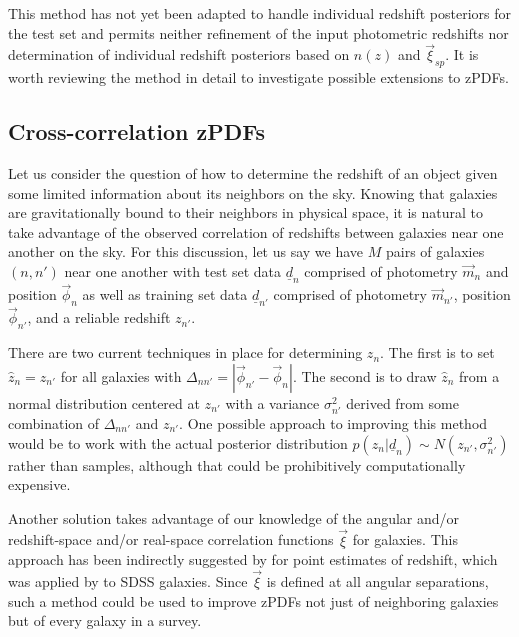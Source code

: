 \documentclass[12pt, onecolumn]{emulateapj}
\newcommand{\textul}{\underline}
\begin{document}
\begin{enumerate}
\end{enumerate}

This method has not yet been adapted to handle individual redshift posteriors for the test set and permits neither refinement of the input photometric redshifts nor determination of individual redshift posteriors based on $n(z)$ and $\vec{\xi}_{sp}$.  It is worth reviewing the method in detail to investigate possible extensions to zPDFs.

\subsection{Cross-correlation zPDFs}

Let us consider the question of how to determine the redshift of an object given some limited information about its neighbors on the sky.  Knowing that galaxies are gravitationally bound to their neighbors in physical space, it is natural to take advantage of the observed correlation of redshifts between galaxies near one another on the sky.  For this discussion, let us say we have $M$ pairs of galaxies $(n,n')$ near one another with test set data $\textul{d}_{n}$ comprised of photometry $\vec{m}_{n}$ and position $\vec{\phi}_{n}$ as well as training set data $\textul{d}_{n'}$ comprised of photometry $\vec{m}_{n'}$, position $\vec{\phi}_{n'}$, and a reliable redshift $z_{n'}$.  

There are two current techniques in place for determining $z_{n}$.  The first is to set $\hat{z}_{n}=z_{n'}$ for all galaxies with $\Delta_{nn'}=|\vec{\phi}_{n'}-\vec{\phi}_{n}|$.  The second is to draw $\hat{z}_{n}$ from a normal distribution centered at $z_{n'}$ with a variance $\sigma^{2}_{n'}$ derived from some combination of $\Delta_{nn'}$ and $z_{n'}$.  One possible approach to improving this method would be to work with the actual posterior distribution $p(z_{n}|\textul{d}_{n})\sim N(z_{n'},\sigma^{2}_{n'})$ rather than samples, although that could be prohibitively computationally expensive.

Another solution takes advantage of our knowledge of the angular and/or redshift-space and/or real-space correlation functions $\vec{\xi}$ for galaxies.  This approach has been indirectly suggested by \citet{sch06} for point estimates of redshift, which was applied by \citet{rah14} to SDSS galaxies. Since $\vec{\xi}$ is defined at all angular separations, such a method could be used to improve zPDFs not just of neighboring galaxies but of every galaxy in a survey.  




\end{document}
